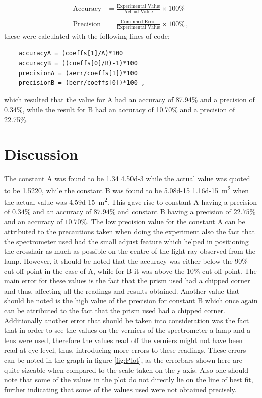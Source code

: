 \documentclass[12pt, a4paper]{article}
\begin{document}
\begin{align*}
    \text{Accuracy} &= \frac{\text{Experimental Value}}{\text{Actual Value}} \times 100\% \\
    \\
    \text{Precision}&=\frac{\text{Combined Error}}{\text{Experimental Value}} \times 100\% \,,
\end{align*}
these were calculated with the following lines of code:
\begin{verbatim}
    accuracyA = (coeffs[1]/A)*100
    accuracyB = ((coeffs[0]/B)-1)*100
    precisionA = (aerr/coeffs[1])*100
    precisionB = (berr/coeffs[0])*100 ,
\end{verbatim}
which resulted that the value for A had an accuracy of 87.94\% and a precision of 0.34\%, while the result for B had an accuracy of 10.70\% and a precision of 22.75\%.

\section*{Discussion}
The constant A was found to be \num{1.34} \textpm \num{4.50d-3} while the actual value was quoted to be \num{1.5220}, while the constant B was found to be \num{5.08d-15} \textpm \qty{1.16d-15}{\metre\squared} when the actual value was \qty{4.59d-15}{\metre\squared}. This gave rise to constant A having a precision of $0.34\%$ and an accuracy of $87.94\%$ and constant B having a precision of $22.75\%$ and an accuracy of $10.70\%$. The low precision value for the constant A can be attributed to the precautions taken when doing the experiment also the fact that the spectrometer used had the small adjust feature which helped in positioning the crosshair as much as possible on the centre of the light ray observed from the lamp. However, it should be noted that the accuracy was either below the 90\% cut off point in the case of A, while for B it was above the 10\% cut off point. The main error for these values is the fact that the prism used had a chipped corner and thus, affecting all the readings and results obtained. Another value that should be noted is the high value of the precision for constant B which once again can be attributed to the fact that the prism used had a chipped corner. Additionally another error that should be taken into consideration was the fact that in order to see the values on the verniers of the spectrometer a lamp and a lens were used, therefore the values read off the verniers might not have been read at eye level, thus, introducing more errors to these readings. These errors can be noted in the graph in figure \ref{fig:Plot}, as the errorbars shown here are quite sizeable when compared to the scale taken on the y-axis. Also one should note that some of the values in the plot do not directly lie on the line of best fit, further indicating that some of the values used were not obtained precisely. 
\end{document}
